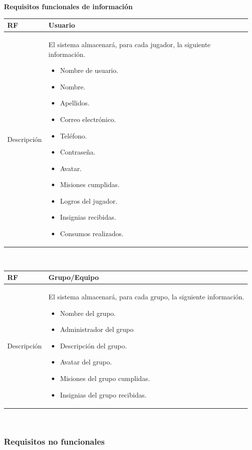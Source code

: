 \documentclass[twoside]{report}
\newcommand\addrow[2]{#1 &#2\\ }
\newcommand\addheading[2]{#1 &#2\\ \hline}
\newcommand\tabularhead{\begin{tabular}{lp{0.7\textwidth}}
\hline
}
\newenvironment{req}{\tabularhead}
{\hline\end{tabular}}
\begin{document}
\textbf{Requisitos funcionales de información}\\

\begin{req}
	\addheading{\textbf{RF\arabic{functionalRequirements}}}{Usuario}
	\addrow{Descripción}{
	El sistema almacenará, para cada jugador, la siguiente información.
	\begin{multicols}{2}
	\begin{itemize}
		\item Nombre de usuario.
		\item Nombre.
		\item Apellidos.
		\item Correo electrónico.
		\item Teléfono.
		\item Contraseña.
		\item Avatar.
		\item Misiones cumplidas.
		\item Logros del jugador.
		\item Insignias recibidas.
		\item Consumos realizados.
	\end{itemize}
	\end{multicols}
	}
\end{req}\\

\begin{req}
	\addheading{\textbf{RF\arabic{functionalRequirements}}}{Grupo/Equipo}
	\addrow{Descripción}{
	El sistema almacenará, para cada grupo, la siguiente información.
	\begin{multicols}{2}
	\begin{itemize}
		\item Nombre del grupo.
		\item Administrador del grupo
		\item Descripción del grupo.
		\item Avatar del grupo.
		\item Misiones del grupo cumplidas.
		\item Insignias del grupo recibidas.
	\end{itemize}
	\end{multicols}
	}
\end{req}\\

\subsubsection{Requisitos no funcionales}
\end{document}

